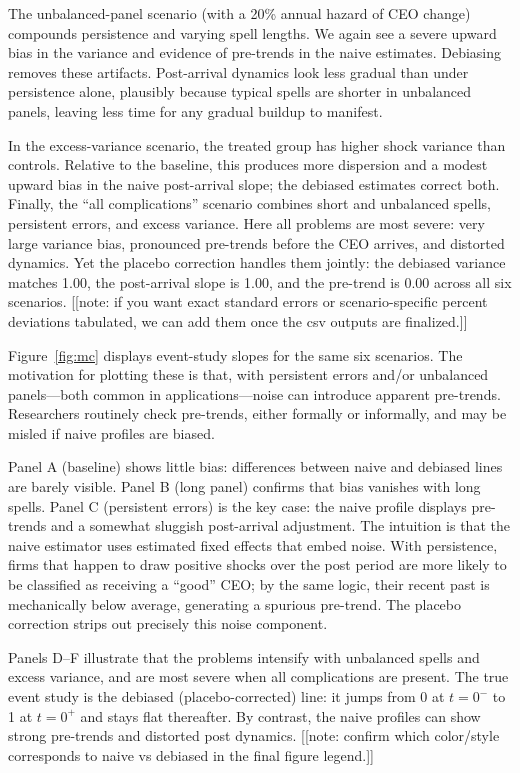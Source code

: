 \documentclass[11pt,a4paper]{article}
\begin{document}
The unbalanced-panel scenario (with a 20\% annual hazard of CEO change) compounds persistence and varying spell lengths. We again see a severe upward bias in the variance and evidence of pre-trends in the naive estimates. Debiasing removes these artifacts. Post-arrival dynamics look less gradual than under persistence alone, plausibly because typical spells are shorter in unbalanced panels, leaving less time for any gradual buildup to manifest.

In the excess-variance scenario, the treated group has higher shock variance than controls. Relative to the baseline, this produces more dispersion and a modest upward bias in the naive post-arrival slope; the debiased estimates correct both. Finally, the “all complications” scenario combines short and unbalanced spells, persistent errors, and excess variance. Here all problems are most severe: very large variance bias, pronounced pre-trends before the CEO arrives, and distorted dynamics. Yet the placebo correction handles them jointly: the debiased variance matches 1.00, the post-arrival slope is 1.00, and the pre-trend is 0.00 across all six scenarios. [[note: if you want exact standard errors or scenario-specific percent deviations tabulated, we can add them once the csv outputs are finalized.]]

Figure~\ref{fig:mc} displays event-study slopes for the same six scenarios. The motivation for plotting these is that, with persistent errors and/or unbalanced panels—both common in applications—noise can introduce apparent pre-trends. Researchers routinely check pre-trends, either formally or informally, and may be misled if naive profiles are biased.

Panel A (baseline) shows little bias: differences between naive and debiased lines are barely visible. Panel B (long panel) confirms that bias vanishes with long spells. Panel C (persistent errors) is the key case: the naive profile displays pre-trends and a somewhat sluggish post-arrival adjustment. The intuition is that the naive estimator uses estimated fixed effects that embed noise. With persistence, firms that happen to draw positive shocks over the post period are more likely to be classified as receiving a “good” CEO; by the same logic, their recent past is mechanically below average, generating a spurious pre-trend. The placebo correction strips out precisely this noise component.

Panels D–F illustrate that the problems intensify with unbalanced spells and excess variance, and are most severe when all complications are present. The true event study is the debiased (placebo-corrected) line: it jumps from 0 at $t=0^{-}$ to 1 at $t=0^{+}$ and stays flat thereafter. By contrast, the naive profiles can show strong pre-trends and distorted post dynamics. [[note: confirm which color/style corresponds to naive vs debiased in the final figure legend.]]
\end{document}
